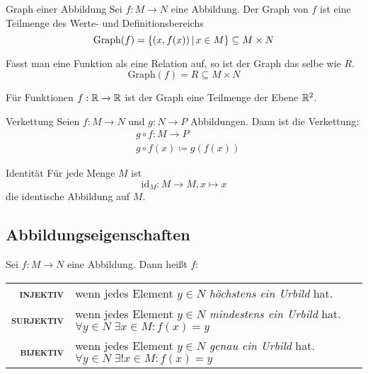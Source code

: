 \begin{definition}{Graph einer Abbildung}
	Sei $f:M\rightarrow N$ eine Abbildung. Der Graph von $f$ ist eine Teilmenge des Werte- und Definitionsbereichs
	\begin{equation*}
		\mathrm{Graph}(f)=\left\{ (x,f(x)) \,\middle|\, x\in M \right\}\subseteq M\times N
	\end{equation*}
\end{definition}

Fasst man eine Funktion als eine Relation auf, so ist der Graph das selbe wie $R$.
\begin{equation*}
	\mathrm{Graph}(f)=R\subseteq M\times N
\end{equation*}

\bemerkung Für Funktionen $f:\mathbb{R}\rightarrow\mathbb{R}$ ist der Graph eine Teilmenge der Ebene $\mathbb{R}^2$.

\begin{definition}{Verkettung}
	Seien $f:M\rightarrow N$ und $g:N\rightarrow P$ Abbildungen. Dann ist die Verkettung:
	\begin{align*}
	  &g\circ f:M\rightarrow P\\
	  &g\circ f(x)\coloneqq g(f(x))
	\end{align*}
\end{definition}


\begin{definition}{Identität}
	Für jede Menge $M$ ist
	\begin{equation*}
	  \mathrm{id}_M:M\rightarrow M, x\mapsto x
	\end{equation*}
	die identische Abbildung auf $M$.
\end{definition}


\subsection{Abbildungseigenschaften}
Sei $f:M\rightarrow N$ eine Abbildung. Dann heißt $f$:

\medskip
\renewcommand{\arraystretch}{1.4}
\begin{tabular}{>{\bfseries\scshape}r l}
	injektiv & wenn jedes Element $y\in N$ \emph{höchstens ein Urbild} hat.\\
	surjektiv & wenn jedes Element $y\in N$ \emph{mindestens ein Urbild} hat. $\forall y\in N\; \exists x\in M : f(x) = y$\\
	bijektiv & wenn jedes Element $y\in N$ \emph{genau ein Urbild} hat. $\forall y\in N\; \exists! x\in M : f(x) = y$
\end{tabular}
\medskip

